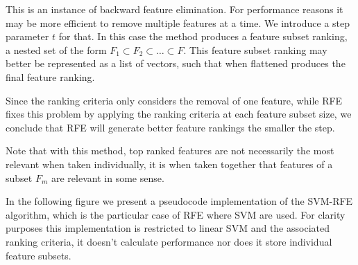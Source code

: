 This is an instance of backward feature elimination. For performance reasons it may be more efficient to remove multiple features at a time. We introduce a step parameter $t$ for that. In this case the method produces a feature subset ranking, a nested set of the form $F_1 \subset F_2 \subset \dots \subset F$. This feature subset ranking may better be represented as a list of vectors, such that when flat\-tened produces the final feature ranking.

Since the ranking criteria only considers the removal of one feature, while RFE fixes this problem by applying the ranking criteria at each feature subset size, we conclude that RFE will generate better feature rankings the smaller the step.

Note that with this method, top ranked features are not necessarily the most relevant when taken individually, it is when taken together that features of a subset $F_m$ are relevant in some sense.

In the following figure we present a pseudocode implementation of the SVM-RFE algorithm, which is the particular case of RFE where SVM are used. For clarity purposes this implementation is restricted to linear SVM and the associated ranking criteria, it doesn't calculate performance nor does it store individual feature subsets.

